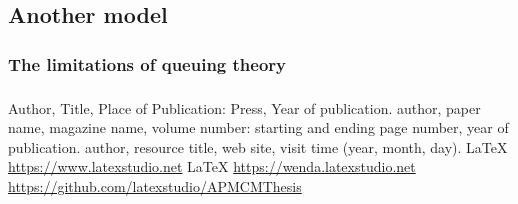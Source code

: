\documentclass{apmcmthesis}
\begin{document}
\subsection{Another model}
\subsubsection{The limitations of queuing theory}




\subsubsection{}


\subsubsection{}



\subsubsection{}





\begin{thebibliography}{9}%
 Author, Title, Place of Publication: Press, Year of publication.
 author, paper name, magazine name, volume number: starting and ending
page number, year of publication.
 author, resource title, web site, visit time (year, month, day).
  \LaTeX{} \url{https://www.latexstudio.net}
  \LaTeX{} \url{https://wenda.latexstudio.net}
    \url{https://github.com/latexstudio/APMCMThesis}
\end{thebibliography}

\newpage
\end{document}
